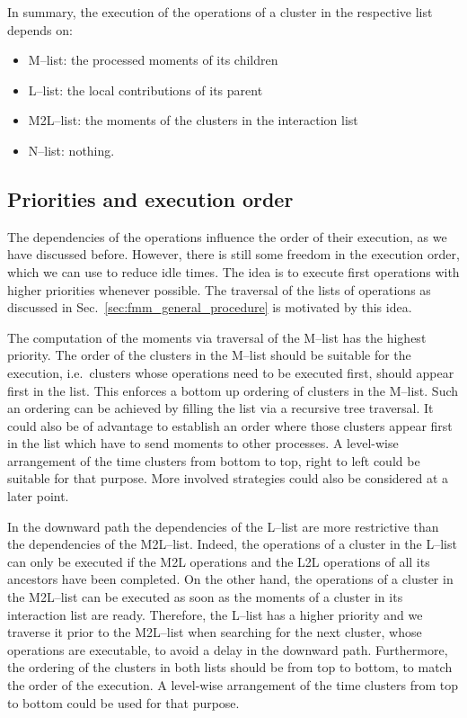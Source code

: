 \documentclass[a4paper,11pt]{article}
\theoremstyle{plain}
\theoremstyle{definition}
\theoremstyle{remark}
\begin{document}
In summary, the execution of the operations of a cluster in the respective list depends on:
\begin{itemize}
  \item M--list: the processed moments of its children
  \item L--list: the local contributions of its parent
  \item M2L--list: the moments of the clusters in the interaction list
  \item N--list: nothing.
\end{itemize}

\subsection{Priorities and execution order}
The dependencies of the operations influence the order of their execution, as we have discussed before. However, there is still some freedom in the execution order, which we can use to reduce idle times. The idea is to execute first operations with higher priorities whenever possible. The traversal of the lists of operations as discussed in Sec.~\ref{sec:fmm_general_procedure} is motivated by this idea.

The computation of the moments via traversal of the M--list has the highest priority. The order of the clusters in the M--list should be suitable for the execution, i.e.~clusters whose operations need to be executed first, should appear first in the list. This enforces a bottom up ordering of clusters in the M--list. Such an ordering can be achieved by filling the list via a recursive tree traversal. It could also be of advantage to establish an order where those clusters appear first in the list which have to send moments to other processes. A level-wise arrangement of the time clusters from bottom to top, right to left could be suitable for that purpose. More involved strategies could also be considered at a later point.

In the downward path the dependencies of the L--list are more restrictive than the dependencies of the M2L--list. Indeed, the operations of a cluster in the L--list can only be executed if the M2L operations and the L2L operations of all its ancestors have been completed. On the other hand, the operations of a cluster in the M2L--list can be executed as soon as the moments of a cluster in its interaction list are ready. Therefore, the L--list has a higher priority and we traverse it prior to the M2L--list when searching for the next cluster, whose operations are executable, to avoid a delay in the downward path. Furthermore, the ordering of the clusters in both lists should be from top to bottom, to match the order of the execution. A level-wise arrangement of the time clusters from top to bottom could be used for that purpose.  
\end{document}
